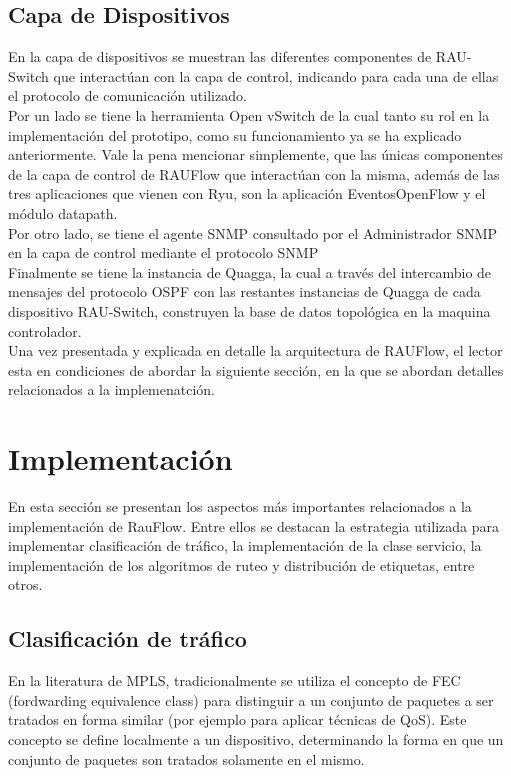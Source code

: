 \subsection{Capa de Dispositivos}
En la capa de dispositivos se muestran las diferentes componentes de RAU-Switch que interact\'uan con la capa de control, indicando para cada una de ellas el protocolo de comunicaci\'on utilizado.\\

Por un lado se tiene la herramienta Open vSwitch de la cual tanto su rol en la implementaci\'on del prototipo, como su funcionamiento ya se ha explicado anteriormente. Vale la pena mencionar simplemente, que las \'unicas componentes de la capa de control de RAUFlow que interact\'uan con la misma, adem\'as de las tres aplicaciones que vienen con Ryu, son la aplicaci\'on EventosOpenFlow y el m\'odulo datapath.\\

Por otro lado, se tiene el agente SNMP consultado por el Administrador SNMP en la capa de control mediante el protocolo SNMP\\

Finalmente se tiene la instancia de Quagga, la cual a través del intercambio de mensajes del protocolo OSPF con las restantes instancias de Quagga de cada dispositivo RAU-Switch, construyen la base de datos topol\'ogica en la maquina controlador. \\

Una vez presentada y explicada en detalle la arquitectura de RAUFlow, el lector esta en condiciones de abordar la siguiente secci\'on, en la que se abordan detalles relacionados a la implemenatci\'on.

\section[Implementaci\'on]{Implementaci\'on}

En esta secci\'on se presentan los aspectos m\'as importantes relacionados a la implementaci\'on de RauFlow. Entre ellos se destacan la estrategia utilizada para implementar clasificaci\'on de tr\'afico,  la implementaci\'on de la clase servicio, la implementaci\'on de los algoritmos de ruteo y distribución de etiquetas, entre otros.\\

\subsection{Clasificación de tr\'afico}
En la literatura de MPLS, tradicionalmente se utiliza el concepto de FEC (fordwarding equivalence class) para distinguir a un conjunto de paquetes a ser tratados en forma similar (por ejemplo para aplicar t\'ecnicas de QoS). Este concepto se define localmente a un dispositivo, determinando la forma en que un conjunto de paquetes son tratados solamente en el mismo.

